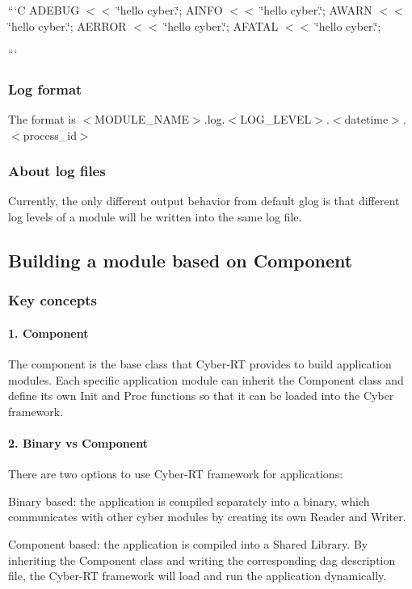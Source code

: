 ```\-C A\-D\-E\-B\-U\-G $<$$<$ \char`\"{}hello cyber.\char`\"{}; A\-I\-N\-F\-O $<$$<$ \char`\"{}hello cyber.\char`\"{}; A\-W\-A\-R\-N $<$$<$ \char`\"{}hello cyber.\char`\"{}; A\-E\-R\-R\-O\-R $<$$<$ \char`\"{}hello cyber.\char`\"{}; A\-F\-A\-T\-A\-L $<$$<$ \char`\"{}hello cyber.\char`\"{};

```

\subsubsection*{Log format}

The format is {\ttfamily $<$M\-O\-D\-U\-L\-E\-\_\-\-N\-A\-M\-E$>$.log.$<$L\-O\-G\-\_\-\-L\-E\-V\-E\-L$>$.$<$datetime$>$.$<$process\-\_\-id$>$}

\subsubsection*{About log files}

Currently, the only different output behavior from default glog is that different log levels of a module will be written into the same log file.

\subsection*{Building a module based on Component}

\subsubsection*{Key concepts}

\paragraph*{1. Component}

The component is the base class that Cyber-\/\-R\-T provides to build application modules. Each specific application module can inherit the Component class and define its own {\ttfamily Init} and {\ttfamily Proc} functions so that it can be loaded into the Cyber framework.

\paragraph*{2. Binary vs Component}

There are two options to use Cyber-\/\-R\-T framework for applications\-:


\begin{DoxyItemize}
\item Binary based\-: the application is compiled separately into a binary, which communicates with other cyber modules by creating its own {\ttfamily Reader} and {\ttfamily Writer}.
\item Component based\-: the application is compiled into a Shared Library. By inheriting the Component class and writing the corresponding dag description file, the Cyber-\/\-R\-T framework will load and run the application dynamically.
\end{DoxyItemize}

